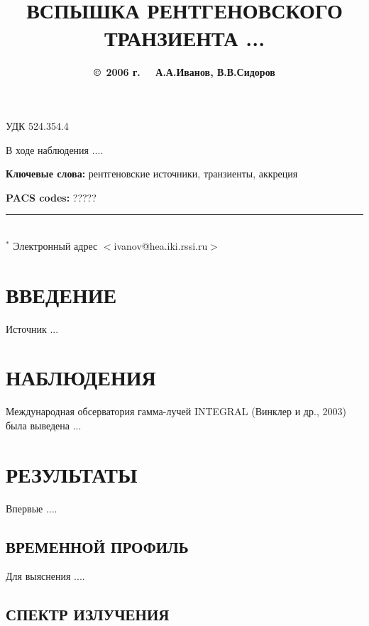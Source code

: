 \documentclass[12pt]{article}
\begin{document}
\baselineskip 21pt

УДК 524.354.4

\title{\bf ВСПЫШКА РЕНТГЕНОВСКОГО ТРАНЗИЕНТА ...}

\author{\bf \hspace{-1.3cm}\copyright\, 2006 г. \ \ 
А.А.Иванов, В.В.Сидоров}


\vspace{2mm}
\received{\today}

\sloppypar 
\vspace{2mm}
\noindent
В ходе наблюдения .... 

\noindent
{\bf Ключевые слова:\/} рентгеновские источники, транзиенты, аккреция

\noindent
{\bf PACS codes:\/} ?????

\vfill
\noindent\rule{8cm}{1pt}\\
{$^*$ Электронный адрес $<$ivanov@hea.iki.rssi.ru$>$}

\clearpage

\section*{ВВЕДЕНИЕ}
\noindent
Источник ... 


\section*{НАБЛЮДЕНИЯ}
\noindent
Международная обсерватория гамма-лучей INTEGRAL (Винклер и
др., 2003) была выведена ... 

\section*{РЕЗУЛЬТАТЫ}
\noindent
Впервые ....

\subsection*{ВРЕМЕННОЙ ПРОФИЛЬ}
\noindent
Для выяснения ....

\subsection*{СПЕКТР ИЗЛУЧЕНИЯ}
\noindent
\end{document}
